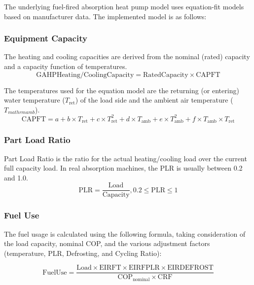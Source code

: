 The underlying fuel-fired absorption heat pump model uses equation-fit models based on manufacturer data. The implemented model is as follows: 

\subsubsection{Equipment Capacity}
The heating and cooling capacities are derived from the nominal (rated) capacity and a capacity function of temperatures. 
\begin{equation}
\mathrm{GAHP Heating/Cooling Capacity} = \mathrm{Rated Capacity} \times \mathrm{CAPFT}
\end{equation}

The temperatures used for the equation model are the returning (or entering) water temperature ($T_{\mathrm{ret}}$) of the load side and the ambient air temperature ($T_{mathrm{amb}}$).
\begin{equation}
\mathrm{CAPFT} = a + b \times T_{\mathrm{ret}} + c \times T_{\mathrm{ret}}^{2} + d \times T_{\mathrm{amb}} + e \times T_{\mathrm{amb}}^{2} + f \times T_{\mathrm{amb}} \times T_{\mathrm{ret}}
\end{equation}

\subsubsection{Part Load Ratio}
Part Load Ratio is the ratio for the actual heating/cooling load over the current full capacity load. In real absorption machines, the PLR is usually between 0.2 and 1.0. 
\begin{equation}
\mathrm{PLR} = \frac{\mathrm{Load}}{\mathrm{Capacity}}, 0.2 \leq \mathrm{PLR} \leq 1
\end{equation}

\subsubsection{Fuel Use}
The fuel usage is calculated using the following formula, taking consideration of the load capacity, nominal COP, and the various adjustment factors (temperature, PLR, Defrosting, and Cycling Ratio):

\begin{equation}
\mathrm{Fuel Use} = \frac{\mathrm{Load} \times \mathrm{EIRFT} \times \mathrm{EIRFPLR} \times \mathrm{EIRDEFROST}}{\mathrm{COP}_\mathrm{nominal} \times \mathrm{CRF}}
\end{equation}

